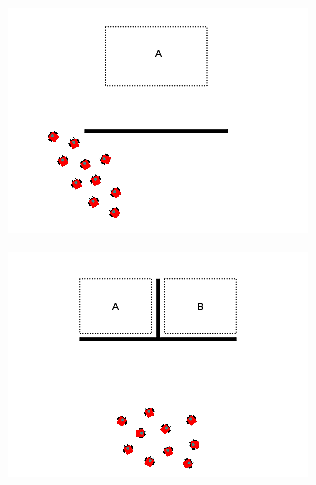 \begin{minipage}{\linewidth}
	\centering
	\begin{minipage}{0.42\linewidth}
		\includegraphics[width=\linewidth]{../ui_experiment/slide_images/Swarm_Robot_Control_-_10_Robot_0007.png}
		\label{fig:10_stop}
	\end{minipage}
	\begin{minipage}{0.42\linewidth}
		\includegraphics[width=\linewidth]{../ui_experiment/slide_images/Swarm_Robot_Control_-_10_Robot_0009.png}
		\label{fig:10_divide}
	\end{minipage}
\end{minipage}
